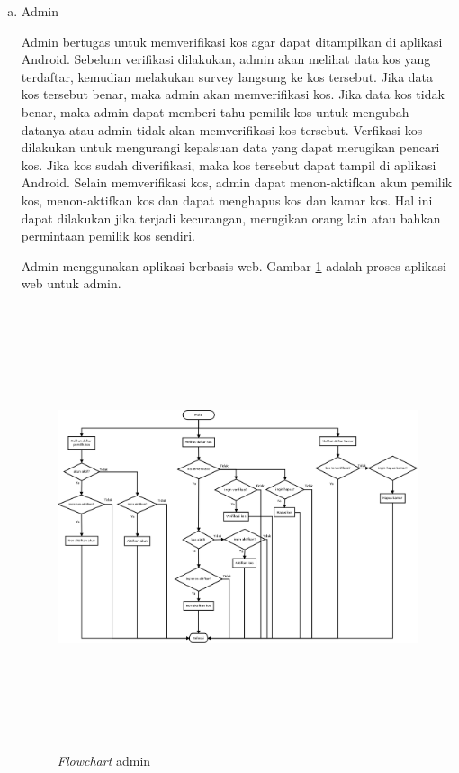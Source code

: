\begin{enumerate}[a.]
		\item Admin
		
		Admin bertugas untuk memverifikasi kos agar dapat ditampilkan di aplikasi Android. Sebelum verifikasi dilakukan, admin akan melihat data kos yang terdaftar, kemudian melakukan survey langsung ke kos tersebut. Jika data kos tersebut benar, maka admin akan memverifikasi kos. Jika data kos tidak benar, maka admin dapat memberi tahu pemilik kos untuk mengubah datanya atau admin tidak akan memverifikasi kos tersebut. Verfikasi kos dilakukan untuk mengurangi kepalsuan data yang dapat merugikan pencari kos. Jika kos sudah diverifikasi, maka kos tersebut dapat tampil di aplikasi Android. Selain memverifikasi kos, admin dapat menon-aktifkan akun pemilik kos, menon-aktifkan kos dan dapat menghapus kos dan kamar kos. Hal ini dapat dilakukan jika terjadi kecurangan, merugikan orang lain atau bahkan permintaan pemilik kos sendiri.
		
		Admin menggunakan aplikasi berbasis web.  Gambar \ref{flow3} adalah proses aplikasi web untuk admin.
		
		\begin{landscape}
			\begin{figure}[H]
				\centering
				\includegraphics [width = 24cm, height= 13cm]{gambar/ocl/flowAdmin}
				\caption{\textit{Flowchart} admin}
				\label{flow3}
			\end{figure}
		\end{landscape}
		
		\end{enumerate}
	
